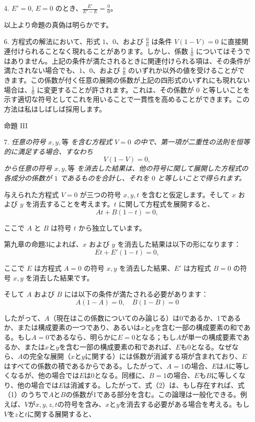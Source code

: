 \documentclass[a4paper,11pt,openany]{ltjsbook}
\begin{document}
4. $E' = 0$, $E = 0$ のとき、$\displaystyle\frac{E'}{E'-E} = \frac{0}{0}$。

以上より命題の真偽は明らかです。

6. 方程式の解法において、形式 \(1\)、\(0\)、および \(\frac{0}{0}\) は条件 \(V(1 - V) = 0\) に直接関連付けられることなく現れることがあります。しかし、係数 \(\frac{1}{0}\) についてはそうではありません。上記の条件が満たされるときに関連付けられる項は、その条件が満たされない場合でも、\(1\)、\(0\)、および \(\frac{0}{0}\) のいずれか以外の値を受けることができます。この係数が付く任意の展開の係数が上記の四形式のいずれにも現れない場合は、\(\frac{1}{0}\) に変更することが許されます。これは、その係数が \(0\) と等しいことを示す適切な符号としてこれを用いることで一貫性を高めることができます。この方法は私はしばしば採用します。

\centerline{\textsc{命題 III}}

7. \textit{任意の符号 \(x, y, 等\) を含む方程式 \(V = 0\) の中で、第一項が二重性の法則を恒等的に満足する場合、すなわち
\[
V(1 - V) = 0,
\]
から任意の符号 \(x, y, 等\) を消去した結果は、他の符号に関して展開した方程式の各成分の係数が \(1\) であるものを合計し、それを \(0\) と等しいことで得られます。}

与えられた方程式 \(V = 0\) が三つの符号 \(x, y, t\) を含むと仮定します。そして \(x\) および \(y\) を消去することを考えます。\(t\) に関して方程式を展開すると、
\setcounter{equation}{0}
\begin{equation}
At + B(1 - t) = 0,
\end{equation}

ここで \(A\) と \(B\) は符号 \(t\) から独立しています。

第九章の命題3によれば、\(x\) および \(y\) を消去した結果は以下の形になります：
\begin{equation}
Et + E'(1 - t) = 0,
\end{equation}

ここで \(E\) は方程式 \(A = 0\) の符号 \(x, y\) を消去した結果、\(E'\) は方程式 \(B = 0\) の符号 \(x, y\) を消去した結果です。

そして \(A\) および \(B\) には以下の条件が満たされる必要があります：
\[
A(1 - A) = 0, \quad B(1 - B) = 0
\]

したがって、$A$（現在はこの係数についてのみ論じる）は0であるか、1であるか、または構成要素の一つであり、あるいは$x$と$y$を含む一部の構成要素の和である。もし$A = 0$であるなら、明らかに$E = 0$となる；もし$A$が単一の構成要素であるか、または$x$と$y$を含む一部の構成要素の和であれば、$E$も0となる。なぜなら、$A$の完全な展開（$x$と$y$に関する）には係数が消滅する項が含まれており、$E$はすべての係数の積であるからである。したがって、$A = 1$の場合、$E$は$A$に等しくなるが、他の場合では$E$は0となる。同様に、$B = 1$の場合、$E$も$B$に等しくなり、他の場合では$E$は消滅する。したがって、式（2）は、もし存在すれば、式（1）のうちで$A$と$B$の係数が1である部分を含む。この論理は一般化できる。例えば、$V$が$x, y, z, t$の符号を含み、$x$と$y$を消去する必要がある場合を考える。もし$V$を$z$と$t$に関する展開すると、
\end{document}
